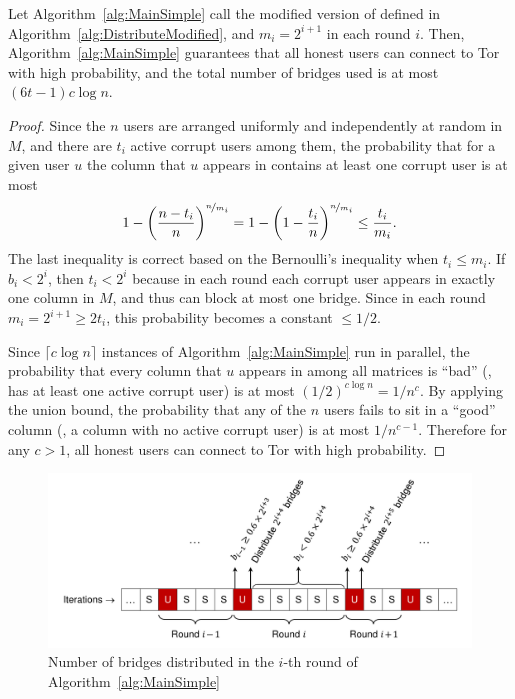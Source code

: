 \begin{lemma} \label{lem:WhpMatrix}
	Let Algorithm~\ref{alg:MainSimple} call the modified version of  defined in Algorithm~\ref{alg:DistributeModified}, and ${m_i = 2^{i+1}}$ in each round $i$. Then, Algorithm~\ref{alg:MainSimple} guarantees that all honest users can connect to Tor with high probability, and the total number of bridges used is at most ${(6t - 1)c\log{n}}$.
\end{lemma}
\begin{proof}
	Since the $n$ users are arranged uniformly and independently at random in $M$, and there are $t_i$ active corrupt users among them, the probability that for a given user $u$ the column that $u$ appears in contains at least one corrupt user is at most
	\[1 - \left(\frac{n-t_i}{n}\right)^{\nicefrac{n}{m_i}} = 1 - \left(1-\frac{t_i}{n}\right)^{\nicefrac{n}{m_i}} \leq \frac{t_i}{m_i}.\]
	The last inequality is correct based on the Bernoulli's inequality when ${t_i \leq m_i}$. If ${b_i < 2^i}$, then ${t_i < 2^i}$ because in each round each corrupt user appears in exactly one column in $M$, and thus can block at most one bridge. Since in each round ${m_i = 2^{i+1} \geq 2t_i}$, this probability becomes a constant ${\leq 1/2}$.
	
	Since ${\lceil c\log{n} \rceil}$ instances of Algorithm~\ref{alg:MainSimple} run in parallel, the probability that every column that $u$ appears in among all matrices is ``bad'' (\ie, has at least one active corrupt user) is at most ${(1/2)^{c\log{n}} = 1/n^c}$.
	By applying the union bound, the probability that any of the $n$ users fails to sit in a ``good'' column (\ie, a column with no active corrupt user) is at most $1/n^{c-1}$. Therefore for any ${c > 1}$, all honest users can connect to Tor with high probability.	
\end{proof}

\begin{figure}
	\centering
	\includegraphics[width=0.76\linewidth]{images/rounds}
	\caption{Number of bridges distributed in the $i$-th round of Algorithm~\ref{alg:MainSimple}}
	\label{fig:rounds}
\end{figure}

